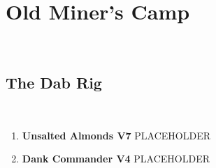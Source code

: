 \section{Old Miner's Camp}\label{sa:Old Miner's Camp}
\

\subsection*{The Dab Rig}\label{bf:The Dab Rig}
\

\begin{enumerate}[]
	\item\label{rt:Unsalted Almonds} \colorbox{Goldenrod!50}{\textbf{Unsalted Almonds V7  } }
	\newline PLACEHOLDER\
	\item\label{rt:Dank Commander} \colorbox{RoyalBlue!20}{\textbf{Dank Commander V4  } }
	\newline PLACEHOLDER\
\end{enumerate}
\clearpage